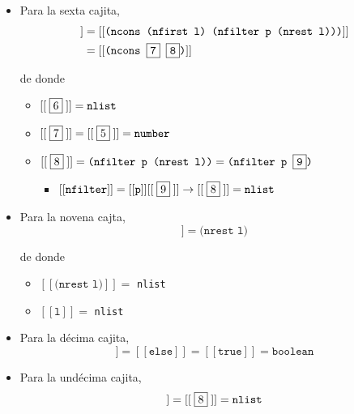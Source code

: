 \documentclass[letterpaper,11pt]{article}
\begin{document}
\begin{enumerate}
\begin{enumerate}
\begin{itemize}
            \item Para la sexta cajita, 
            \begin{align*}
                [[\;\fbox{6}\;]] 
                &= [[\texttt{(ncons (nfirst l) (nfilter p (nrest l)))}]] \\
                &= [[\texttt{(ncons \fbox{7} \fbox{8})}]]
            \end{align*}

            de donde 
            \begin{itemize}
                \item $[[\;\fbox{6}\;]] = \texttt{nlist}$
                \item $[[\;\fbox{7}\;]] = [[\;\fbox{5}\;]] =\texttt{number}$
                \item $[[\;\fbox{8}\;]] = \texttt{(nfilter p (nrest l))} = 
                \texttt{(nfilter p \fbox{9})}$
                \begin{itemize}
                    \item $[[\texttt{nfilter}]] = [[\texttt{p}]] [[\;\fbox{9}\;]]
                    \rightarrow [[\;\fbox{8}\;]] = \texttt{nlist}$
                \end{itemize}
            \end{itemize}

            \item Para la novena cajta,
            \begin{equation*}
                [[\;\fbox{9}\;]] = \texttt{(nrest l)}
            \end{equation*}

            de donde 
            \begin{itemize}
                \item $[[\texttt{(nrest l)}]] = $ \texttt{nlist}
                \item $[[\texttt{l}]] = $ \texttt{nlist}
            \end{itemize}

            \item Para la décima cajita, 
            \begin{equation*}
                [[\;\fbox{10}\;]] = [[\texttt{else}]] = [[\texttt{true}]] = 
                \texttt{boolean}
            \end{equation*}

            \item Para la undécima cajita, 
            \begin{equation*}
                [[\;\fbox{11}\;]] = [[\;\fbox{8}\;]] = \texttt{nlist}
            \end{equation*}


\end{itemize}
\end{enumerate}
\end{enumerate}
\end{document}
